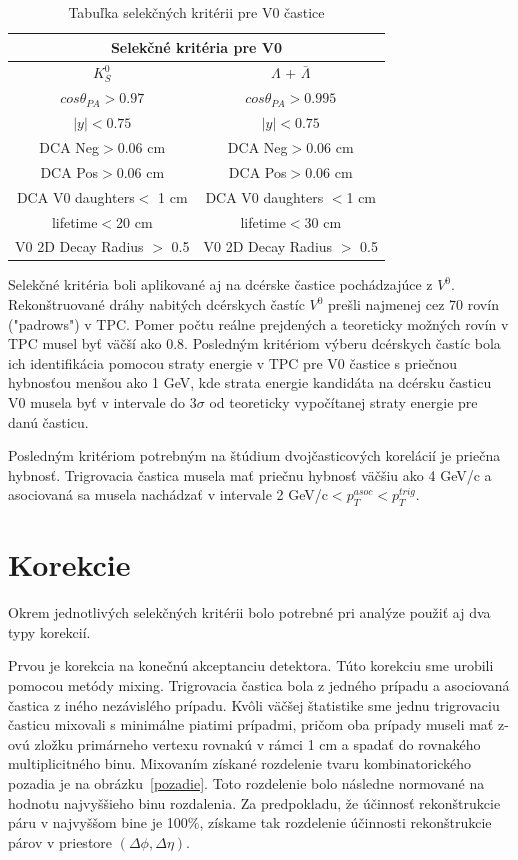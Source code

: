 \documentclass[thesismargins, thesislinespacing]{rnthesis}
\begin{document}
\begin{table}[hbtp!]
	\begin{center}
		\begin{tabular}{|c|c|}
			\hline
			 \multicolumn{2}{|c|}{Selekčné kritéria pre V0}  \\ \hline
			$K^0_S$ & $\Lambda$ + $\bar{\Lambda}$ \\ \hline
			$cos\theta_{PA} >0.97$ & $cos\theta_{PA} >0.995$  \\ \hline
			$|y|<0.75$ & $|y|<0.75$   \\ \hline
			DCA Neg$>$0.06 cm & DCA Neg$>$0.06 cm \\ \hline
			DCA Pos$>$0.06 cm & DCA Pos$>$0.06 cm \\ \hline
			DCA V0 daughters$<$ 1 cm & DCA V0 daughters $<$1 cm \\ \hline
			lifetime$<$20 cm & lifetime$<$30 cm \\ \hline
			V0 2D Decay Radius $>$ 0.5 & V0 2D Decay Radius $>$ 0.5\\ 
			\hline
		\end{tabular}
		\caption{Tabuľka selekčných kritérii pre V0 častice}
		\label{tabulka}
	\end{center}
\end{table}
\newpage
Selekčné kritéria boli aplikované aj na dcérske častice pochádzajúce z $V^0$. Rekonštruované dráhy nabitých dcérskych častíc $V^0$ prešli najmenej cez 70 rovín ("padrows") v TPC. Pomer počtu reálne prejdených a teoreticky možných rovín v TPC musel byť väčší ako 0.8. Posledným kritériom výberu dcérskych častíc bola ich identifikácia pomocou straty energie v TPC pre V0 častice s priečnou hybnosťou menšou ako 1 GeV, kde strata energie kandidáta na dcérsku časticu V0 musela byť v intervale do $3\sigma$ od teoreticky vypočítanej straty energie pre danú časticu.

Posledným kritériom potrebným na štúdium dvojčasticových korelácií je priečna hybnosť. Trigrovacia častica musela mať priečnu hybnosť väčšiu ako 4 GeV/c a asociovaná sa musela nachádzať v intervale 2 GeV/c$<p_T^{asoc}<p_T^{trig}$.

\section{Korekcie}
Okrem jednotlivých selekčných kritérii bolo potrebné pri analýze použiť aj dva typy korekcií. 

Prvou je korekcia na konečnú akceptanciu detektora. Túto korekciu sme urobili pomocou metódy mixing. Trigrovacia častica bola z jedného prípadu a asociovaná častica z iného nezávislého prípadu. Kvôli väčšej štatistike sme jednu trigrovaciu časticu mixovali s minimálne piatimi prípadmi, pričom oba prípady museli mať z-ovú zložku primárneho vertexu rovnakú v rámci 1 cm a spadať do rovnakého multiplicitného binu. Mixovaním získané rozdelenie tvaru kombinatorického pozadia je na obrázku~\ref{pozadie}. Toto rozdelenie bolo následne normované na hodnotu najvyššieho binu rozdalenia. Za predpokladu, že účinnosť rekonštrukcie páru v najvyššom bine je 100\%, získame tak rozdelenie účinnosti rekonštrukcie párov v priestore $(\Delta \phi,\Delta\eta)$.
\end{document}
